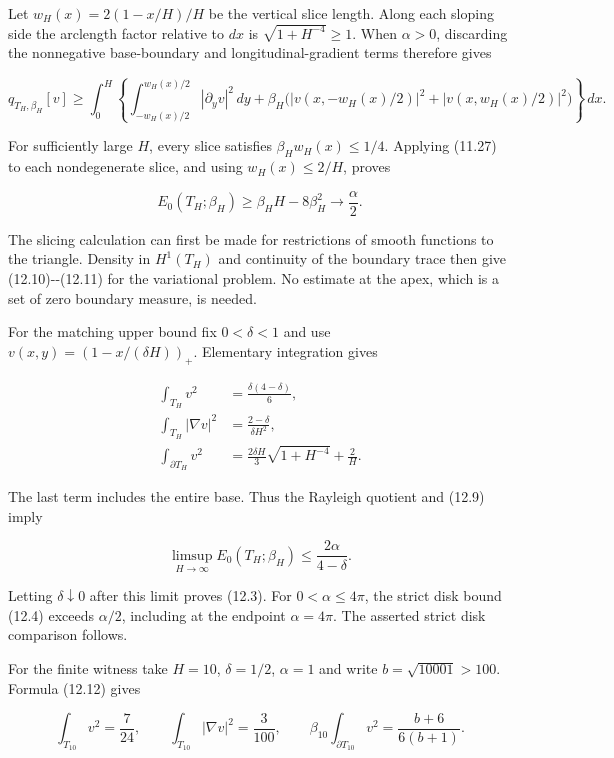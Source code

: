 \documentclass[11pt]{article}
\begin{document}
Let \(w_H(x)=2(1-x/H)/H\) be the vertical slice length. Along each
sloping side the arclength factor relative to \(dx\) is
\(\sqrt{1+H^{-4}}\ge1\). When \(\alpha>0\), discarding the nonnegative
base-boundary and longitudinal-gradient terms therefore gives

\[
q_{T_H,\beta_H}[v]
\ge\int_0^H\left\{
\int_{-w_H(x)/2}^{w_H(x)/2}|\partial_yv|^2\,dy
+\beta_H\bigl(|v(x,-w_H(x)/2)|^2+|v(x,w_H(x)/2)|^2\bigr)
\right\}\,dx.
\tag{12.10}
\]

For sufficiently large \(H\), every slice satisfies
\(\beta_Hw_H(x)\le1/4\). Applying (11.27) to each nondegenerate slice,
and using \(w_H(x)\le2/H\), proves

\[
E_0(T_H;\beta_H)\ge \beta_H H-8\beta_H^2
\longrightarrow\frac\alpha2.
\tag{12.11}
\]

The slicing calculation can first be made for restrictions of smooth
functions to the triangle. Density in \(H^1(T_H)\) and continuity of the
boundary trace then give (12.10)-\/-(12.11) for the variational problem.
No estimate at the apex, which is a set of zero boundary measure, is
needed.

For the matching upper bound fix \(0<\delta<1\) and use
\(v(x,y)=(1-x/(\delta H))_+\). Elementary integration gives

\[
\begin{split}
\int_{T_H}v^2&=\frac{\delta(4-\delta)}6,\\
\int_{T_H}|\nabla v|^2&=\frac{2-\delta}{\delta H^2},\\
\int_{\partial T_H}v^2&=\frac{2\delta H}{3}\sqrt{1+H^{-4}}+\frac2H.
\end{split}
\tag{12.12}
\]

The last term includes the entire base. Thus the Rayleigh quotient and
(12.9) imply

\[
\limsup_{H\to\infty}E_0(T_H;\beta_H)
\le\frac{2\alpha}{4-\delta}.
\tag{12.13}
\]

Letting \(\delta\downarrow0\) after this limit proves (12.3). For
\(0<\alpha\le4\pi\), the strict disk bound (12.4) exceeds \(\alpha/2\),
including at the endpoint \(\alpha=4\pi\). The asserted strict disk
comparison follows.

For the finite witness take \(H=10\), \(\delta=1/2\), \(\alpha=1\) and
write \(b=\sqrt{10001}>100\). Formula (12.12) gives

\[
\int_{T_{10}}v^2=\frac7{24},\qquad
\int_{T_{10}}|\nabla v|^2=\frac3{100},\qquad
\beta_{10}\int_{\partial T_{10}}v^2
=\frac{b+6}{6(b+1)}.
\tag{12.14}
\]
\end{document}
